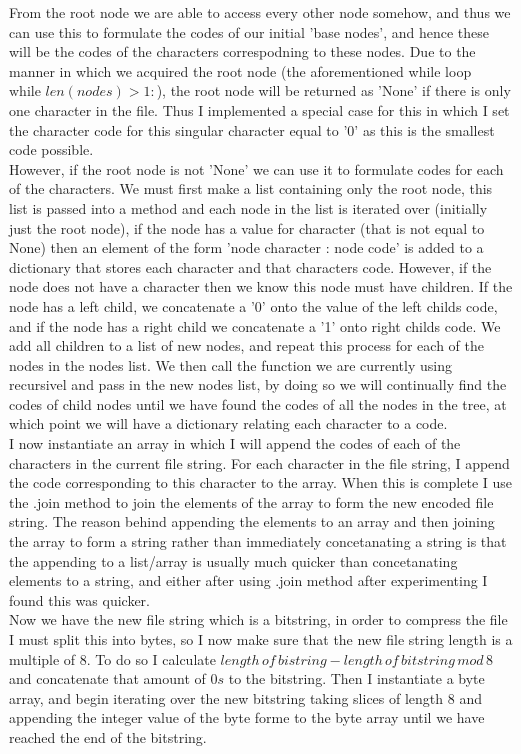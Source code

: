 \documentclass{mm2}
\begin{document}
From the root node we are able to access every other node somehow, and thus we can use this to formulate the codes of our initial 'base nodes', and hence these will be the codes of the characters correspodning to these nodes. Due to the manner in which we acquired the root node (the aforementioned while loop $\text{while } len(nodes)>1:$), the root node will be returned as 'None' if there is only one character in the file. Thus I implemented a special case for this in which I set the character code for this singular character equal to '0' as this is the smallest code possible. \\
However, if the root node is not 'None' we can use it to formulate codes for each of the characters. We must first make a list containing only the root node, this list is passed into a method and each node in the list is iterated over (initially just the root node), if the node has a value for character (that is not equal to None) then an element of the form 'node character : node code' is added to a dictionary that stores each character and that characters code. However, if the node does not have a character then we know this node must have children. If the node has a left child, we concatenate a '0' onto the value of the left childs code, and if the node has a right child we concatenate a '1' onto right childs code. We add all children to a list of new nodes, and repeat this process for each of the nodes in the nodes list. We then call the function we are currently using recursivel and pass in the new nodes list, by doing so we will continually find the codes of child nodes until we have found the codes of all the nodes in the tree, at which point we will have a dictionary relating each character to a code.\\
I now instantiate an array in which I will append the codes of each of the characters in the current file string. For each character in the file string, I append the code corresponding to this character to the array. When this is complete I use the .join method to join the elements of the array to form the new encoded file string. The reason behind appending the elements to an array and then joining the array to form a string rather than immediately concetanating a string is that the appending to a list/array is usually much quicker than concetanating elements to a string, and either after using .join method after experimenting I found this was quicker.\\
Now we have the new file string which is a bitstring, in order to compress the file I must split this into bytes, so I now make sure that the new file string length is a multiple of 8. To do so I calculate $ length\, of \,bistring - length \, of \, bitstring \, mod \,8$ and concatenate that amount of $0s$ to the bitstring. Then I instantiate a byte array, and begin iterating over the new bitstring taking slices of length 8 and appending the integer value of the byte forme to the byte array until we have reached the end of the bitstring.\\
\end{document}

